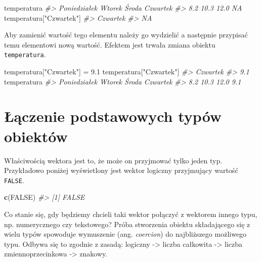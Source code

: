 \documentclass[paper=6in:9in,pagesize=pdftex,headinclude=on,footinclude=on,10pt]{scrbook}
\newenvironment{Shaded}{\begin{snugshade}}{\end{snugshade}}
\newcommand{\CommentTok}[1]{\textcolor[rgb]{0.56,0.35,0.01}{\textit{#1}}}
\newcommand{\FloatTok}[1]{\textcolor[rgb]{0.00,0.00,0.81}{#1}}
\newcommand{\KeywordTok}[1]{\textcolor[rgb]{0.13,0.29,0.53}{\textbf{#1}}}
\newcommand{\NormalTok}[1]{#1}
\newcommand{\OtherTok}[1]{\textcolor[rgb]{0.56,0.35,0.01}{#1}}
\newcommand{\StringTok}[1]{\textcolor[rgb]{0.31,0.60,0.02}{#1}}
\begin{document}
\begin{Shaded}
\begin{Highlighting}[]
\NormalTok{temperatura}
\CommentTok{#> Poniedziałek       Wtorek        Środa     Czwartek }
\CommentTok{#>          8.2         10.3         12.0           NA}
\NormalTok{temperatura[}\StringTok{"Czwartek"}\NormalTok{]}
\CommentTok{#> Czwartek }
\CommentTok{#>       NA}
\end{Highlighting}
\end{Shaded}

Aby zamienić wartość tego elementu należy go wydzielić a następnie przypisać temu elementowi nową wartość.
Efektem jest trwała zmiana obiektu \texttt{temperatura}.

\begin{Shaded}
\begin{Highlighting}[]
\NormalTok{temperatura[}\StringTok{"Czwartek"}\NormalTok{] =}\StringTok{ }\FloatTok{9.1}
\NormalTok{temperatura[}\StringTok{"Czwartek"}\NormalTok{]}
\CommentTok{#> Czwartek }
\CommentTok{#>      9.1}
\NormalTok{temperatura}
\CommentTok{#> Poniedziałek       Wtorek        Środa     Czwartek }
\CommentTok{#>          8.2         10.3         12.0          9.1}
\end{Highlighting}
\end{Shaded}

\hypertarget{lpto-vector}{%
\section{Łączenie podstawowych typów obiektów}\label{lpto-vector}}

Właściwością wektora jest to, że może on przyjmować tylko jeden typ.
Przykładowo poniżej wyświetlony jest wektor logiczny przyjmujący wartość \texttt{FALSE}.

\begin{Shaded}
\begin{Highlighting}[]
\KeywordTok{c}\NormalTok{(}\OtherTok{FALSE}\NormalTok{)}
\CommentTok{#> [1] FALSE}
\end{Highlighting}
\end{Shaded}

Co stanie się, gdy będziemy chcieli taki wektor połączyć z wektorem innego typu, np. numerycznego czy tekstowego?
Próba stworzenia obiektu składającego się z wielu typów spowoduje wymuszenie (ang. \emph{coercion}) do najbliższego możliwego typu.
Odbywa się to zgodnie z zasadą: logiczny -\textgreater{} liczba całkowita -\textgreater{} liczba zmiennoprzecinkowa -\textgreater{} znakowy.
\end{document}
